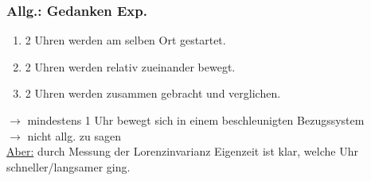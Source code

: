 \documentclass[titlepage,12pt,a4paper,ngerman]{report}
\begin{document}
\subsubsection{Allg.: Gedanken Exp.}
\begin{enumerate}[1)]
	\item 2 Uhren werden am selben Ort gestartet.
	\item 2 Uhren werden relativ zueinander bewegt.
	\item 2 Uhren werden zusammen gebracht und verglichen.
\end{enumerate}
$ \rightarrow $ mindestens 1 Uhr bewegt sich in einem beschleunigten Bezugssystem\\
$ \rightarrow $ nicht allg. zu sagen \\[5pt]
\underline{Aber:} durch Messung der Lorenzinvarianz Eigenzeit ist klar, welche Uhr schneller/langsamer ging.
\end{document}
